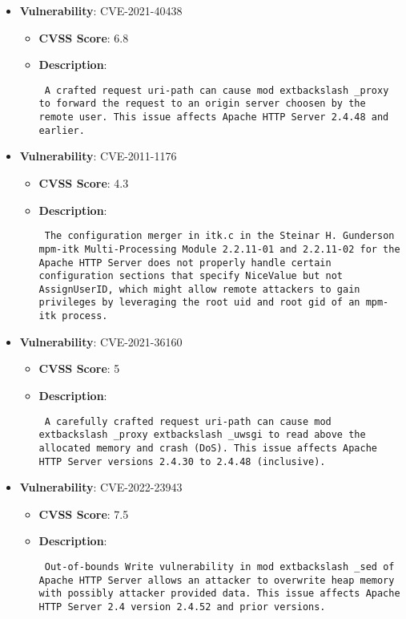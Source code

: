 \documentclass{article}
\begin{document}
\begin{itemize}
        \item \textbf{Vulnerability}: CVE-2021-40438
        \begin{itemize}
            \item \textbf{CVSS Score}:  6.8 
            \item \textbf{Description}: \parbox{\linewidth}{\texttt{ A crafted request uri-path can cause mod	extbackslash _proxy to forward the request to an origin server choosen by the remote user. This issue affects Apache HTTP Server 2.4.48 and earlier. }}
        \end{itemize}
    
        \item \textbf{Vulnerability}: CVE-2011-1176
        \begin{itemize}
            \item \textbf{CVSS Score}:  4.3 
            \item \textbf{Description}: \parbox{\linewidth}{\texttt{ The configuration merger in itk.c in the Steinar H. Gunderson mpm-itk Multi-Processing Module 2.2.11-01 and 2.2.11-02 for the Apache HTTP Server does not properly handle certain configuration sections that specify NiceValue but not AssignUserID, which might allow remote attackers to gain privileges by leveraging the root uid and root gid of an mpm-itk process. }}
        \end{itemize}
    
        \item \textbf{Vulnerability}: CVE-2021-36160
        \begin{itemize}
            \item \textbf{CVSS Score}:  5 
            \item \textbf{Description}: \parbox{\linewidth}{\texttt{ A carefully crafted request uri-path can cause mod	extbackslash _proxy	extbackslash _uwsgi to read above the allocated memory and crash (DoS). This issue affects Apache HTTP Server versions 2.4.30 to 2.4.48 (inclusive). }}
        \end{itemize}
    
        \item \textbf{Vulnerability}: CVE-2022-23943
        \begin{itemize}
            \item \textbf{CVSS Score}:  7.5 
            \item \textbf{Description}: \parbox{\linewidth}{\texttt{ Out-of-bounds Write vulnerability in mod	extbackslash _sed of Apache HTTP Server allows an attacker to overwrite heap memory with possibly attacker provided data. This issue affects Apache HTTP Server 2.4 version 2.4.52 and prior versions. }}
        \end{itemize}
    

\end{itemize}
\end{document}
